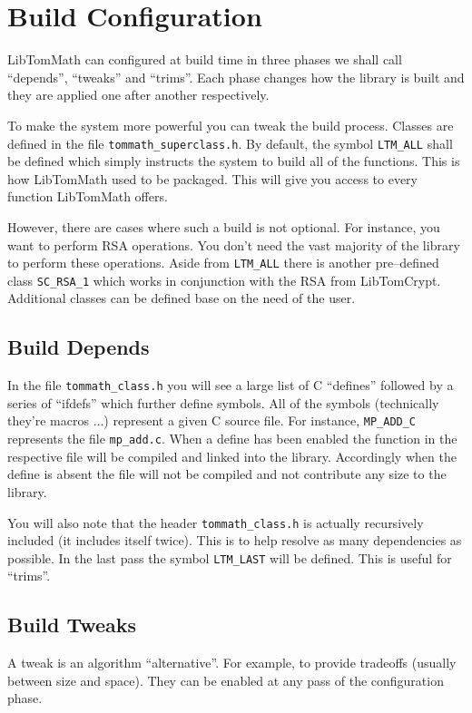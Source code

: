 \documentclass[synpaper]{book}
\begin{document}
\section{Build Configuration}
LibTomMath can configured at build time in three phases we shall call ``depends'', ``tweaks'' and ``trims''.
Each phase changes how the library is built and they are applied one after another respectively.

To make the system more powerful you can tweak the build process.  Classes are defined in the file
\texttt{tommath\_superclass.h}.  By default, the symbol \texttt{LTM\_ALL} shall be defined which simply
instructs the system to build all of the functions.  This is how LibTomMath used to be packaged.  This will give you
access to every function LibTomMath offers.

However, there are cases where such a build is not optional.  For instance, you want to perform RSA operations.  You
don't need the vast majority of the library to perform these operations.  Aside from \texttt{LTM\_ALL} there is
another pre--defined class \texttt{SC\_RSA\_1} which works in conjunction with the RSA from LibTomCrypt.  Additional
classes can be defined base on the need of the user.

\subsection{Build Depends}
In the file \texttt{tommath\_class.h} you will see a large list of C ``defines'' followed by a series of ``ifdefs''
which further define symbols.  All of the symbols (technically they're macros $\ldots$) represent a given C source
file.  For instance, \texttt{MP\_ADD\_C} represents the file \texttt{mp\_add.c}.  When a define has been enabled the
function in the respective file will be compiled and linked into the library.  Accordingly when the define
is absent the file will not be compiled and not contribute any size to the library.

You will also note that the header \texttt{tommath\_class.h} is actually recursively included (it includes itself twice).
This is to help resolve as many dependencies as possible.  In the last pass the symbol \texttt{LTM\_LAST} will be defined.
This is useful for ``trims''.

\subsection{Build Tweaks}
A tweak is an algorithm ``alternative''.  For example, to provide tradeoffs (usually between size and space).
They can be enabled at any pass of the configuration phase.
\end{document}
